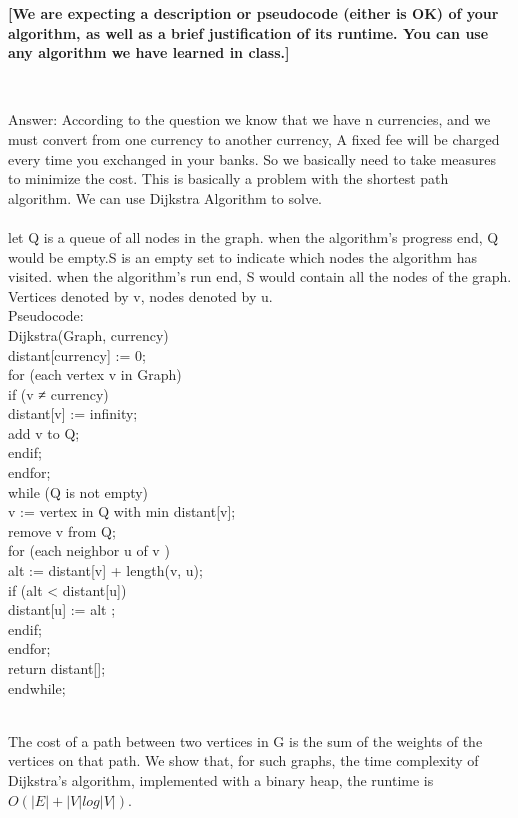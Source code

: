 \documentclass[12pt]{article}
\begin{document}
\begin{enumerate}
      \textbf{[We are expecting a description or pseudocode (either is OK) of your algorithm, as well as a brief justification of its runtime. You can use any algorithm we have learned in class.]}
      
    \\{\color{blue}Answer: According to the question we know that we have n currencies, and we must convert from one currency to another currency, A fixed fee will be charged every time you exchanged in your banks. So we basically need to take measures to minimize the cost. This is basically a problem with the shortest path algorithm. We can use Dijkstra Algorithm to solve. 
    \\
    \\let Q is a queue of all nodes in the graph. when the algorithm's progress end, Q would be empty.S is an empty set to indicate which nodes the algorithm has visited. when the algorithm's run end, S would contain all the nodes of the graph. Vertices denoted by v, nodes denoted by u.
    \\Pseudocode:
    \\Dijkstra(Graph, currency)
    \\ distant[currency]  := 0;                   
    \\for (each vertex v in Graph)    
    \\if (v ≠ currency)
    \\distant[v]  := infinity;           
    \\add v to Q;   
    \\endif;
    \\endfor;
    \\while (Q is not empty)             
    \\v := vertex in Q with min distant[v];  
    \\remove v from Q;
    \\   for (each neighbor u of v )     
    \\       alt := distant[v] + length(v, u);
    \\     if (alt < distant[u])           
    \\       distant[u]  := alt ;
    \\endif;
    \\endfor;
    \\return distant[];
    \\endwhile;
    
    \\The cost of a path between two vertices in G is the sum of the weights of the vertices on that path. We show that, for such graphs, the time complexity of Dijkstra's algorithm, implemented with a binary heap, the runtime is $O(|E|+|V|log|V|)$.


}
\end{enumerate}
\end{document}

